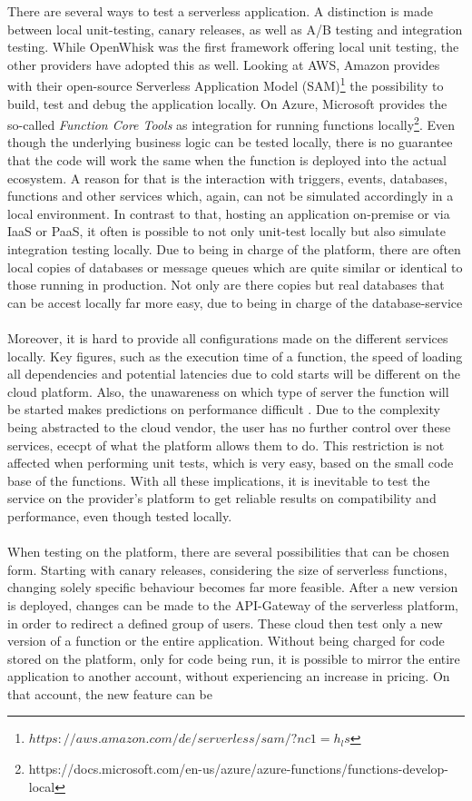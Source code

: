 \documentclass[a4paper,twoside,11pt, pagesize]{scrartcl}
\begin{document}
There are several ways to test a serverless application. A distinction is made between local unit-testing, canary releases, as well as A/B testing and integration testing. While OpenWhisk was the first framework offering local unit testing, the other providers have adopted this as well. Looking at AWS, Amazon provides with their open-source Serverless Application Model (SAM)\footnote{$https://aws.amazon.com/de/serverless/sam/?nc1=h_ls$} the possibility to build, test and debug the application locally. On Azure, Microsoft provides the so-called \textit{Function Core Tools} as integration for running functions locally\footnote{https://docs.microsoft.com/en-us/azure/azure-functions/functions-develop-local}. Even though the underlying business logic can be tested locally, there is no guarantee that the code will work the same when the function is deployed into the actual ecosystem. A reason for that is the interaction with triggers, events, databases, functions and other services which, again, can not be simulated accordingly in a local environment. In contrast to that, hosting an application on-premise or via IaaS or PaaS, it often is possible to not only unit-test locally but also simulate integration testing locally. Due to being in charge of the platform, there are often local copies of databases or message queues which are quite similar or identical to those running in production. Not only are there copies but real databases that can be accest locally far more easy, due to being in charge of the \glqq database-service\grqq{}\\\\ Moreover, it is hard to provide all configurations made on the different services locally. Key figures, such as the execution time of a function, the speed of loading all dependencies and potential latencies due to cold starts will be different on the cloud platform. Also, the unawareness on which type of server the function will be started makes predictions on performance difficult \cite{racicot2019quality}. Due to the complexity being abstracted to the cloud vendor, the user has no further control over these services, ececpt of what the platform allows them to do. This restriction is not affected when performing unit tests, which is very easy, based on the small code base of the functions. With all these implications, it is inevitable to test the service on the provider's platform to get reliable results on compatibility and performance, even though tested locally.\\\\ When testing on the platform, there are several possibilities that can be chosen form. Starting with canary releases, considering the size of serverless functions, changing solely specific behaviour becomes far more feasible. After a new version is deployed, changes can be made to the API-Gateway of the serverless platform, in order to redirect a defined group of users. These cloud then test only a new version of a function or the entire application. Without being charged for code stored on the platform, only for code being run, it is possible to mirror the entire application to another account, without experiencing an increase in pricing. On that account, the new feature can be 
\end{document}
